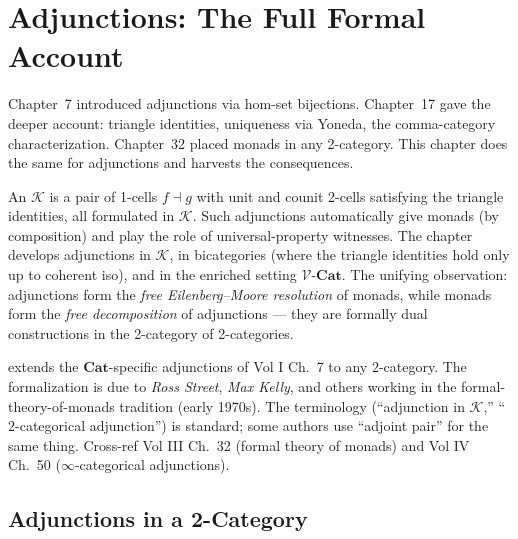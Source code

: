 
\chapter{Adjunctions: The Full Formal Account}

\begin{overviewbox}
Chapter~7 introduced adjunctions via hom-set bijections. Chapter~17 gave the
deeper account: triangle identities, uniqueness via Yoneda, the comma-category
characterization. Chapter~32 placed monads in any 2-category. This chapter
does the same for adjunctions and harvests the consequences.

An  $\mathcal{K}$ is a pair of 1-cells
$f \dashv g$ with unit and counit 2-cells satisfying the triangle identities,
all formulated in $\mathcal{K}$. Such adjunctions automatically give monads
(by composition) and play the role of universal-property witnesses. The
chapter develops adjunctions in $\mathcal{K}$, in bicategories (where the
triangle identities hold only up to coherent iso), and in the enriched
setting $\mathcal{V}$-$\mathbf{Cat}$. The unifying observation: adjunctions
form the \emph{free Eilenberg--Moore resolution} of monads, while monads
form the \emph{free decomposition} of adjunctions — they are formally dual
constructions in the 2-category of 2-categories.
\end{overviewbox}


\begin{nameorigin}
 extends the $\mathbf{Cat}$-specific
adjunctions of Vol I Ch.~7 to any $2$-category. The formalization is due
to \emph{Ross Street}, \emph{Max Kelly}, and others working in the
formal-theory-of-monads tradition (early 1970s). The terminology
(``adjunction in $\mathcal{K}$,'' ``$2$-categorical adjunction'') is
standard; some authors use ``adjoint pair'' for the same thing.
Cross-ref Vol III Ch.~32 (formal theory of monads) and Vol IV Ch.~50
($\infty$-categorical adjunctions).
\end{nameorigin}

\section{Adjunctions in a 2-Category}
\label{sec:adj-2cat}

